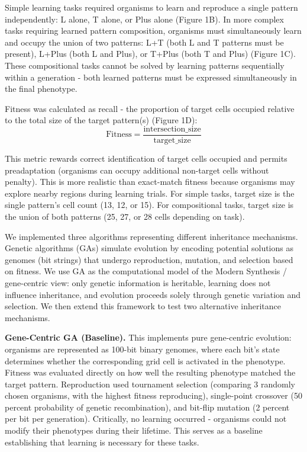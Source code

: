 \documentclass[11pt]{article}
\begin{document}
Simple learning tasks required organisms to learn and reproduce a single pattern independently: L alone, T alone, or Plus alone (Figure 1B). In more complex tasks requiring learned pattern composition, organisms must simultaneously learn and occupy the union of two patterns: L+T (both L and T patterns must be present), L+Plus (both L and Plus), or T+Plus (both T and Plus) (Figure 1C). These compositional tasks cannot be solved by learning patterns sequentially within a generation - both learned patterns must be expressed simultaneously in the final phenotype.

Fitness was calculated as recall - the proportion of target cells occupied relative to the total size of the target pattern(s) (Figure 1D):
\begin{equation}
\text{Fitness} = \frac{\text{intersection}\_\text{size}}{\text{target}\_\text{size}}
\end{equation}

This metric rewards correct identification of target cells occupied and permits preadaptation (organisms can occupy additional non-target cells without penalty). This is more realistic than exact-match fitness because organisms may explore nearby regions during learning trials. For simple tasks, target size is the single pattern's cell count (13, 12, or 15). For compositional tasks, target size is the union of both patterns (25, 27, or 28 cells depending on task).


We implemented three algorithms representing different inheritance mechanisms. Genetic algorithms (GAs) simulate evolution by encoding potential solutions as genomes (bit strings) that undergo reproduction, mutation, and selection based on fitness\citep{Holland1975,Goldberg1989}. We use GA as the computational model of the Modern Synthesis / gene-centric view: only genetic information is heritable, learning does not influence inheritance, and evolution proceeds solely through genetic variation and selection. We then extend this framework to test two alternative inheritance mechanisms.

\textbf{Gene-Centric GA (Baseline).} This implements pure gene-centric evolution: organisms are represented as 100-bit binary genomes, where each bit's state determines whether the corresponding grid cell is activated in the phenotype. Fitness was evaluated directly on how well the resulting phenotype matched the target pattern. Reproduction used tournament selection (comparing 3 randomly chosen organisms, with the highest fitness reproducing), single-point crossover (50 percent probability of genetic recombination), and bit-flip mutation (2 percent per bit per generation). Critically, no learning occurred - organisms could not modify their phenotypes during their lifetime. This serves as a baseline establishing that learning is necessary for these tasks.
\end{document}
